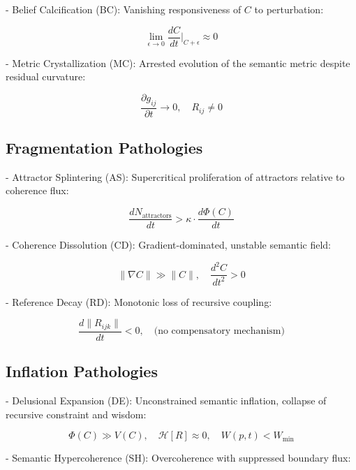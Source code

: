 - Belief Calcification (BC): Vanishing responsiveness of $C$ to perturbation:

\begin{equation}
\lim_{\epsilon \to 0} \frac{dC}{dt}\bigg|_{C+\epsilon} \approx 0
\end{equation}

- Metric Crystallization (MC): Arrested evolution of the semantic metric despite residual curvature:

\begin{equation}
\frac{\partial g_{ij}}{\partial t} \to 0, \quad R_{ij} \neq 0
\end{equation}

\subsection{Fragmentation Pathologies}

- Attractor Splintering (AS): Supercritical proliferation of attractors relative to coherence flux:

\begin{equation}
\frac{dN_{\text{attractors}}}{dt} > \kappa \cdot \frac{d\Phi(C)}{dt}
\end{equation}

- Coherence Dissolution (CD): Gradient-dominated, unstable semantic field:

\begin{equation}
\|\nabla C\| \gg \|C\|, \quad \frac{d^2C}{dt^2} > 0
\end{equation}

- Reference Decay (RD): Monotonic loss of recursive coupling:

\begin{equation}
\frac{d\|R_{ijk}\|}{dt} < 0, \quad \text{(no compensatory mechanism)}
\end{equation}

\subsection{Inflation Pathologies}

- Delusional Expansion (DE): Unconstrained semantic inflation, collapse of recursive constraint and wisdom:

\begin{equation}
\Phi(C) \gg V(C), \quad \mathcal{H}[R] \approx 0, \quad W(p,t) < W_{\text{min}}
\end{equation}

- Semantic Hypercoherence (SH): Overcoherence with suppressed boundary flux:


